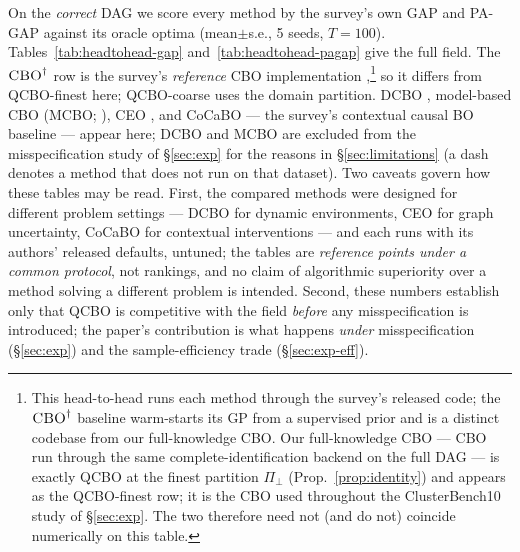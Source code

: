 \documentclass[twoside]{article}
\newcommand{\QCBO}{\textsc{QCBO}}
\newcommand{\CBO}{\textsc{CBO}}
\newcommand{\BO}{\textsc{BO}}
\newcommand{\CEO}{\textsc{CEO}}
\begin{document}
\begin{table}[t]\centering
  \caption{Sample efficiency on the \textsc{CausalBO} survey's benchmark
  datasets ($5$ seeds, $T{=}100$); \QCBO{}-coarse uses the domain partition.
  Coarse GAP exceeds finest's on $23/29$ paired seeds ($5$ of $6$ datasets);
  per-dataset tests are underpowered at $5$ seeds, so we report seed-level
  win/loss.}
  \label{tab:efficiency}
  \small
\end{table}
On the \emph{correct} DAG we score every method by the survey's own GAP and PA-GAP
against its oracle optima (mean$\pm$s.e., 5 seeds, $T{=}100$). Tables~\ref{tab:headtohead-gap}
and~\ref{tab:headtohead-pagap} give the full field. The
$\text{\CBO{}}^{\dagger}$ row is the survey's \emph{reference} \CBO{} implementation
\citep{aglietti2020causal},\footnote{This head-to-head runs each method through the
survey's released code; the $\text{\CBO{}}^{\dagger}$ baseline warm-starts its GP
from a supervised prior and is a distinct codebase from our full-knowledge \CBO{}.
Our full-knowledge \CBO{} --- \CBO{} run through the same complete-identification
backend on the full DAG --- is exactly \QCBO{} at the finest partition $\Pi_\bot$
(Prop.~\ref{prop:identity}) and appears as the \QCBO{}-finest row; it is the \CBO{}
used throughout the ClusterBench10 study of \S\ref{sec:exp}. The two therefore need
not (and do not) coincide numerically on this table.} so it differs from
\QCBO{}-finest here; \QCBO{}-coarse uses the domain partition. DCBO
\citep{aglietti2021dynamic}, model-based \CBO{} (MCBO; \citealp{sussex2023model}),
\CEO{} \citep{branchini2023ceo}, and CoCaBO --- the survey's contextual causal \BO{}
baseline \citep{arsenyan2026contextual} --- appear here; DCBO and MCBO are excluded
from the misspecification study of
\S\ref{sec:exp} for the reasons in \S\ref{sec:limitations} (a dash denotes a method that does
not run on that dataset). Two caveats govern how these tables may be read. First,
the compared methods were designed for different problem settings --- DCBO for
dynamic environments, \CEO{} for graph uncertainty, CoCaBO for contextual
interventions --- and each runs with its
authors' released defaults, untuned; the tables are \emph{reference points
under a common protocol}, not rankings, and no claim of algorithmic superiority
over a method solving a different problem is intended. Second, these numbers
establish only that \QCBO{} is competitive with the field
\emph{before} any misspecification is introduced; the paper's contribution is what happens
\emph{under} misspecification (\S\ref{sec:exp}) and the sample-efficiency trade
(\S\ref{sec:exp-eff}).
\end{document}
